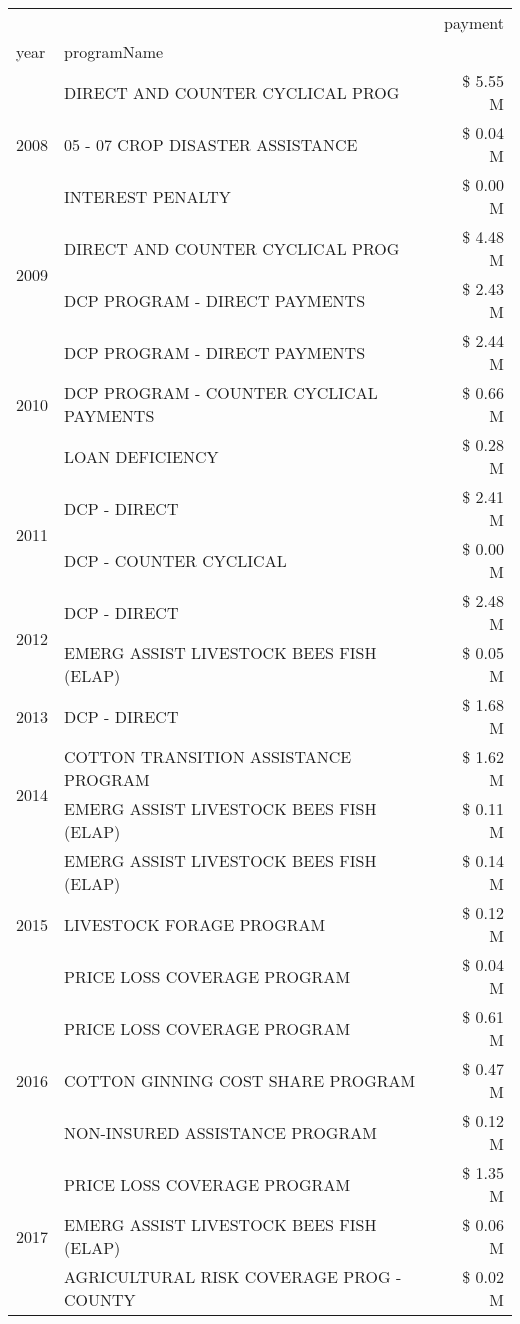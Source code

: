 \begin{tabular}{llr}
\toprule
 &  & payment \\
year & programName &  \\
\midrule
\multirow[t]{3}{*}{2008} & DIRECT AND COUNTER CYCLICAL PROG & \$ 5.55 M \\
 & 05 - 07 CROP DISASTER ASSISTANCE & \$ 0.04 M \\
 & INTEREST PENALTY & \$ 0.00 M \\
\cline{1-3}
\multirow[t]{2}{*}{2009} & DIRECT AND COUNTER CYCLICAL PROG & \$ 4.48 M \\
 & DCP PROGRAM - DIRECT PAYMENTS & \$ 2.43 M \\
\cline{1-3}
\multirow[t]{3}{*}{2010} & DCP PROGRAM - DIRECT PAYMENTS & \$ 2.44 M \\
 & DCP PROGRAM - COUNTER CYCLICAL PAYMENTS & \$ 0.66 M \\
 & LOAN DEFICIENCY & \$ 0.28 M \\
\cline{1-3}
\multirow[t]{2}{*}{2011} & DCP - DIRECT & \$ 2.41 M \\
 & DCP - COUNTER CYCLICAL & \$ 0.00 M \\
\cline{1-3}
\multirow[t]{2}{*}{2012} & DCP - DIRECT & \$ 2.48 M \\
 & EMERG ASSIST LIVESTOCK BEES FISH (ELAP) & \$ 0.05 M \\
\cline{1-3}
2013 & DCP - DIRECT & \$ 1.68 M \\
\cline{1-3}
\multirow[t]{2}{*}{2014} & COTTON TRANSITION ASSISTANCE PROGRAM & \$ 1.62 M \\
 & EMERG ASSIST LIVESTOCK BEES FISH (ELAP) & \$ 0.11 M \\
\cline{1-3}
\multirow[t]{3}{*}{2015} & EMERG ASSIST LIVESTOCK BEES FISH (ELAP) & \$ 0.14 M \\
 & LIVESTOCK FORAGE PROGRAM & \$ 0.12 M \\
 & PRICE LOSS COVERAGE PROGRAM & \$ 0.04 M \\
\cline{1-3}
\multirow[t]{3}{*}{2016} & PRICE LOSS COVERAGE PROGRAM                   & \$ 0.61 M \\
 & COTTON GINNING COST SHARE PROGRAM             & \$ 0.47 M \\
 & NON-INSURED ASSISTANCE PROGRAM                & \$ 0.12 M \\
\cline{1-3}
\multirow[t]{3}{*}{2017} & PRICE LOSS COVERAGE PROGRAM & \$ 1.35 M \\
 & EMERG ASSIST LIVESTOCK BEES FISH (ELAP) & \$ 0.06 M \\
 & AGRICULTURAL RISK COVERAGE PROG - COUNTY & \$ 0.02 M \\

\end{tabular}
